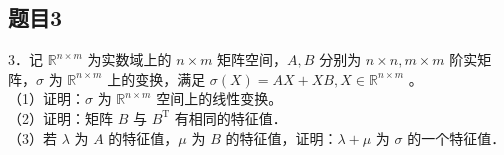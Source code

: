 \documentclass{article}
\begin{document}
\subsection{题目3}
3．记 \(\mathbb{R}^{n \times m}\) 为实数域上的 \(n \times m\) 矩阵空间，\(A, B\) 分别为 \(n \times n, m \times m\) 阶实矩阵，\(\sigma\) 为 \(\mathbb{R}^{n \times m}\) 上的变换，满足 \(\sigma(X)=A X+X B, X \in \mathbb{R}^{n \times m}\) 。\\
（1）证明：\(\sigma\) 为 \(\mathbb{R}^{n \times m}\) 空间上的线性变换。\\
（2）证明：矩阵 \(B\) 与 \(B^{\mathrm{T}}\) 有相同的特征值．\\
（3）若 \(\lambda\) 为 \(A\) 的特征值，\(\mu\) 为 \(B\) 的特征值，证明：\(\lambda+\mu\) 为 \(\sigma\) 的一个特征值．
\end{document}
